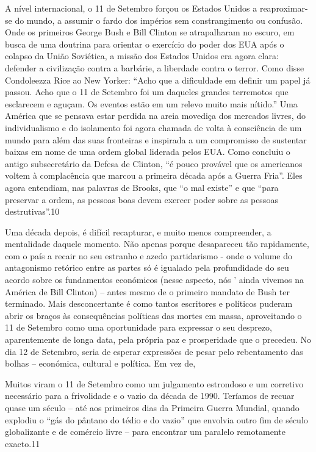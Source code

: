  \par 
A nível internacional, o {\color{blue}11} de Setembro forçou os Estados Unidos a reaproximar-se do mundo, a assumir o fardo dos impérios sem constrangimento ou confusão. Onde os primeiros George Bush e Bill Clinton se atrapalharam no escuro, em busca de uma doutrina para orientar o exercício do poder dos EUA após o colapso da União Soviética, a missão dos Estados Unidos era agora clara: defender a civilização contra a barbárie, a liberdade contra o terror. Como disse Condoleezza Rice ao New Yorker: “Acho que a dificuldade em definir um papel já passou. Acho que o {\color{blue}11} de Setembro foi um daqueles grandes terremotos que esclarecem e aguçam. Os eventos estão em um relevo muito mais nítido.” Uma América que se pensava estar perdida na areia movediça dos mercados livres, do individualismo e do isolamento foi agora chamada de volta à consciência de um mundo para além das suas fronteiras e inspirada a um compromisso de sustentar baixas em nome de uma ordem global liderada pelos EUA. Como concluiu o antigo subsecretário da Defesa de Clinton, “é pouco provável que os americanos voltem à complacência que marcou a primeira década após a Guerra Fria”. Eles agora entendiam, nas palavras de Brooks, que “o mal existe” e que “para preservar a ordem, as pessoas boas devem exercer poder sobre as pessoas destrutivas”.{\color{blue}10}
 \par 
Uma década depois, é difícil recapturar, e muito menos compreender, a mentalidade daquele momento. Não apenas porque desapareceu tão rapidamente, com o país a recair no seu estranho e azedo partidarismo - onde o volume do antagonismo retórico entre as partes só é igualado pela profundidade do seu acordo sobre os fundamentos económicos (nesse aspecto, nós ' ainda vivemos na América de Bill Clinton) – antes mesmo de o primeiro mandato de Bush ter terminado. Mais desconcertante é como tantos escritores e políticos puderam abrir os braços às consequências políticas das mortes em massa, aproveitando o {\color{blue}11} de Setembro como uma oportunidade para expressar o seu desprezo, aparentemente de longa data, pela própria paz e prosperidade que o precedeu. No dia {\color{blue}12} de Setembro, seria de esperar expressões de pesar pelo rebentamento das bolhas – económica, cultural e política. Em vez de,
 \par 
Muitos viram o {\color{blue}11} de Setembro como um julgamento estrondoso e um corretivo necessário para a frivolidade e o vazio da década de 1990. Teríamos de recuar quase um século – até aos primeiros dias da Primeira Guerra Mundial, quando explodiu o “gás do pântano do tédio e do vazio” que envolvia outro fim de século globalizante e de comércio livre – para encontrar um paralelo remotamente exacto.{\color{blue}11}
